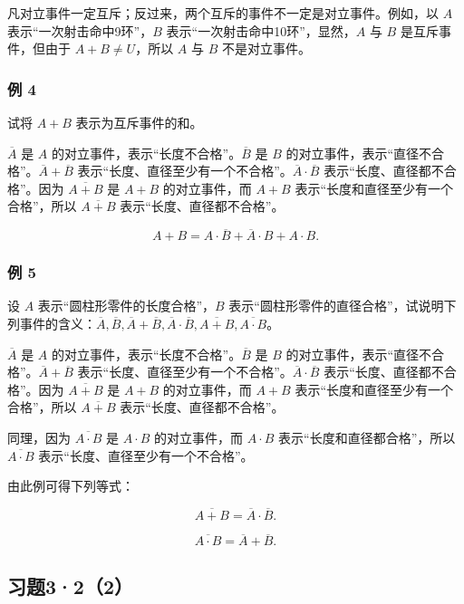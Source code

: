 凡对立事件一定互斥；反过来，两个互斥的事件不一定是对立事件。例如，以
\(A\) 表示``一次射击命中9环''，\(B\)
表示``一次射击命中10环''，显然，\(A\) 与 \(B\) 是互斥事件，但由于
\(A + B \neq U\)，所以 \(A\) 与 \(B\) 不是对立事件。

\subsubsection{例 4}

试将 \(A + B\) 表示为互斥事件的和。

 \(\overline A\) 是 \(A\)
的对立事件，表示``长度不合格''。\(\overline B\) 是 \(B\)
的对立事件，表示``直径不合格''。\(\overline A+\overline B\)
表示``长度、直径至少有一个不合格''。\(\overline A\cdot\overline B\)
表示``长度、直径都不合格''。因为 \(\overline{A+B}\) 是 \(A+B\)
的对立事件，而 \(A+B\) 表示``长度和直径至少有一个合格''，所以
\(\overline{A+B}\) 表示``长度、直径都不合格''。

\[
A + B = A \cdot \overline {{{B}}} + \overline {{{A}}} \cdot B + A \cdot B.
\]

\subsubsection{例 5}

设 \(A\) 表示``圆柱形零件的长度合格''，\(B\)
表示``圆柱形零件的直径合格''，试说明下列事件的含义：\(\overline A,\overline B,\overline A+\overline B,\overline A\cdot\overline B,\overline{A+B},\overline{A\cdot B}\)。

 \(\overline A\) 是 \(A\)
的对立事件，表示``长度不合格''。\(\overline B\) 是 \(B\)
的对立事件，表示``直径不合格''。\(\overline A+\overline B\)
表示``长度、直径至少有一个不合格''。\(\overline A\cdot\overline B\)
表示``长度、直径都不合格''。因为 \(\overline{A+B}\) 是 \(A+B\)
的对立事件，而 \(A+B\) 表示``长度和直径至少有一个合格''，所以
\(\overline{A+B}\) 表示``长度、直径都不合格''。

同理，因为 \(\overline{A\cdot B}\) 是 \(A\cdot B\) 的对立事件，而
\(A\cdot B\) 表示``长度和直径都合格''，所以 \(\overline{A\cdot B}\)
表示``长度、直径至少有一个不合格''。

由此例可得下列等式：

\[
\overline {{A + B}} = \overline {{A}} \cdot \overline {{B}}.
\]

\[
\overline {{A \cdot B}} = \overline {{A}} + \overline {{B}}.
\]

\subsection{习题3·2（2）}

